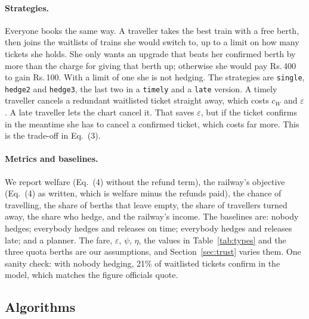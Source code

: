 \documentclass{article}
\newcommand{\rs}{Rs.\,}
\theoremstyle{definition}
\begin{document}
\paragraph{Strategies.} Everyone books the same way. A traveller takes the best train with
a free berth, then joins the waitlists of trains she would switch to, up to a limit on how
many tickets she holds. She only wants an upgrade that beats her confirmed berth by more
than the charge for giving that berth up; otherwise she would pay \rs400 to gain \rs100.
With a limit of one she is not hedging. The strategies are \texttt{single},
\texttt{hedge2} and \texttt{hedge3}, the last two in a \texttt{timely} and a \texttt{late}
version. A timely traveller cancels a redundant waitlisted ticket straight away, which
costs $c_W$ and $\varepsilon$. A late traveller lets the chart cancel it. That saves
$\varepsilon$, but if the ticket confirms in the meantime she has to cancel a confirmed
ticket, which costs far more. This is the trade-off in Eq.~(3).

\paragraph{Metrics and baselines.} We report welfare (Eq.~(4) without the refund term),
the railway's objective (Eq.~(4) as written, which is welfare minus the refunds paid), the
chance of travelling, the share of berths that leave empty, the share of travellers turned
away, the share who hedge, and the railway's income. The baselines are: nobody
hedges; everybody hedges and releases on time; everybody hedges and releases late; and a
planner. The fare, $\varepsilon$, $\psi$, $\eta$, the values in Table~\ref{tab:types} and
the three quota berths are our assumptions, and Section~\ref{sec:trust} varies them. One
sanity check: with nobody hedging, 21\% of waitlisted tickets confirm in the model, which
matches the figure officials quote.

\subsection{Algorithms}
\end{document}
